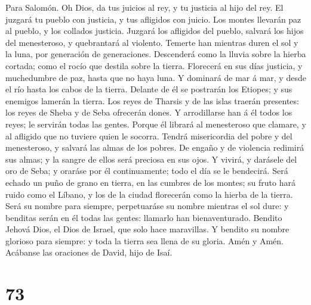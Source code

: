  Para Salomón. Oh Dios, da tus juicios al rey, y tu
justicia al hijo del rey.  El juzgará tu pueblo con
justicia, y tus afligidos con juicio.  Los montes llevarán
paz al pueblo, y los collados justicia.  Juzgará los
afligidos del pueblo, salvará los hijos del menesteroso, y quebrantará
al violento.  Temerte han mientras duren el sol y la luna,
por generación de generaciones.  Descenderá como la lluvia
sobre la hierba cortada; como el rocío que destila sobre la tierra.
 Florecerá en sus días justicia, y muchedumbre de paz,
hasta que no haya luna.  Y dominará de mar á mar, y desde
el río hasta los cabos de la tierra.  Delante de él se
postrarán los Etiopes; y sus enemigos lamerán la tierra. 
Los reyes de Tharsis y de las islas traerán presentes: los reyes de
Sheba y de Seba ofrecerán dones.  Y arrodillarse han á él
todos los reyes; le servirán todas las gentes.  Porque él
librará al menesteroso que clamare, y al afligido que no tuviere quien
le socorra.  Tendrá misericordia del pobre y del
menesteroso, y salvará las almas de los pobres.  De
engaño y de violencia redimirá sus almas; y la sangre de ellos será
preciosa en sus ojos.  Y vivirá, y darásele del oro de
Seba; y oraráse por él continuamente; todo el día se le bendecirá.
 Será echado un puño de grano en tierra, en las cumbres
de los montes; su fruto hará ruido como el Líbano, y los de la ciudad
florecerán como la hierba de la tierra.  Será su nombre
para siempre, perpetuaráse su nombre mientras el sol dure: y benditas
serán en él todas las gentes: llamarlo han bienaventurado.
 Bendito Jehová Dios, el Dios de Israel, que solo hace
maravillas.  Y bendito su nombre glorioso para siempre: y
toda la tierra sea llena de su gloria. Amén y Amén. 
Acábanse las oraciones de David, hijo de Isaí.

\hypertarget{section-72}{%
\section{73}\label{section-72}}

